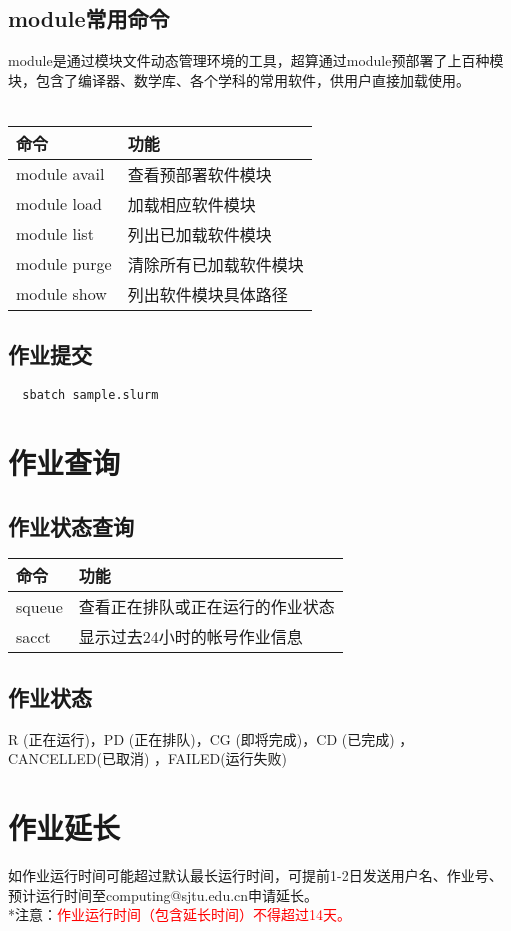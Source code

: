 \documentclass[cn, 12pt, hang, black, chinese]{elegantbook}
\begin{document}
\subsection*{module常用命令}
module是通过模块文件动态管理环境的工具，超算通过module预部署了上百种模块，包含了编译器、数学库、各个学科的常用软件，供用户直接加载使用。\\\\
\begin{tabular}{ |l|l| }
 \hline
 命令 & 功能 \\
 \hline \hline
 module avail & 查看预部署软件模块 \\
 \hline
 module load & 加载相应软件模块 \\
 \hline
 module list & 列出已加载软件模块 \\
 \hline
 module purge & 清除所有已加载软件模块 \\
 \hline
 module show & 列出软件模块具体路径 \\
 \hline
\end{tabular}

\subsection*{作业提交}
\begin{lstlisting}
  sbatch sample.slurm
\end{lstlisting}

\section{作业查询}

\subsection*{作业状态查询}
\begin{tabular}{ |l|l| }
 \hline
 命令 & 功能 \\
 \hline \hline
 squeue & 查看正在排队或正在运行的作业状态 \\
 \hline
 sacct & 显示过去24小时的帐号作业信息 \\
 \hline
\end{tabular}

\subsection*{作业状态}
R (正在运行)，PD (正在排队)，CG (即将完成)，CD (已完成) ，CANCELLED(已取消) ，FAILED(运行失败)

\section{作业延长}
如作业运行时间可能超过默认最长运行时间，可提前1-2日发送用户名、作业号、预计运行时间至computing@sjtu.edu.cn申请延长。\\
*注意：\textcolor{red}{作业运行时间（包含延长时间）不得超过14天。}
\end{document}
